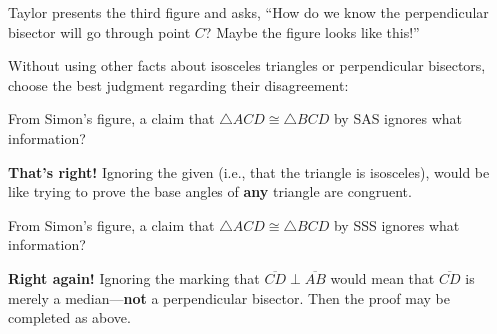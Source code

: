 \documentclass[nooutcomes]{ximera}
\begin{document}
\begin{problem}
Taylor presents the third figure and asks, ``How do we know the perpendicular bisector will go through point $C$?  Maybe the figure looks like this!'' 

Without using other facts about isosceles triangles or perpendicular bisectors, choose the best judgment regarding their disagreement: 

\begin{multipleChoice}
\end{multipleChoice} 

\begin{problem}
From Simon's figure, a claim that $\triangle ACD\cong \triangle BCD$ by SAS ignores what information?
\begin{multipleChoice}
\end{multipleChoice}
\begin{feedback}[correct]
\textbf{That's right!} Ignoring the given (i.e., that the triangle is isosceles), would be like trying to prove the base angles of \textbf{any} triangle are congruent.
\end{feedback}

\begin{problem}
From Simon's figure, a claim that $\triangle ACD\cong \triangle BCD$ by SSS ignores what information?
\begin{multipleChoice}
\end{multipleChoice}
\begin{feedback}[correct]
\textbf{Right again!} Ignoring the marking that $\overline{CD}\perp \overline{AB}$ would mean that $\overline{CD}$ is merely a median---\textbf{not} a perpendicular bisector.  Then the proof may be completed as above.  
\end{feedback}  
\end{problem}
\end{problem}
\end{problem}
\end{document}

